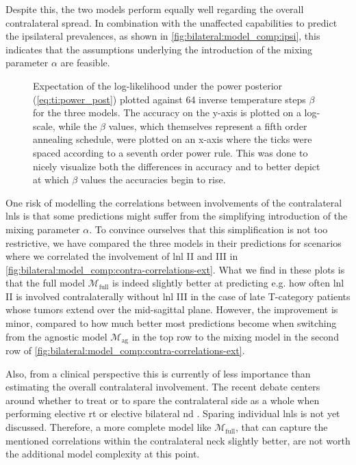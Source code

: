 \documentclass[\relativeRoot/main.tex]{subfiles}
\begin{document}
Despite this, the two models perform equally well regarding the overall contralateral spread. In combination with the unaffected capabilities to predict the ipsilateral prevalences, as shown in \cref{fig:bilateral:model_comp:ipsi}, this indicates that the assumptions underlying the introduction of the mixing parameter $\alpha$ are feasible.

\begin{figure}
    \centering
    
    \caption[Plotted accuracy over the course of a thermodynamic integration round]{
        Expectation of the log-likelihood under the power posterior (\cref{eq:ti:power_post}) plotted against 64 inverse temperature steps $\beta$ for the three models. The accuracy on the y-axis is plotted on a log-scale, while the $\beta$ values, which themselves represent a fifth order annealing schedule, were plotted on an x-axis where the ticks were spaced according to a seventh order power rule. This was done to nicely visualize both the differences in accuracy and to better depict at which $\beta$ values the accuracies begin to rise.
    }
    \label{fig:bilateral:model_comp:thermo_int}
\end{figure}

One risk of modelling the correlations between involvements of the contralateral \glspl{lnl} is that some predictions might suffer from the simplifying introduction of the mixing parameter $\alpha$. To convince ourselves that this simplification is not too restrictive, we have compared the three models in their predictions for scenarios where we correlated the involvement of \gls{lnl} II and III in \cref{fig:bilateral:model_comp:contra-correlations-ext}. What we find in these plots is that the full model $\mathcal{M}_\text{full}$ is indeed slightly better at predicting e.g. how often \gls{lnl} II is involved contralaterally without \gls{lnl} III in the case of late T-category patients whose tumors extend over the mid-sagittal plane. However, the improvement is minor, compared to how much better most predictions become when switching from the agnostic model $\mathcal{M}_\text{ag}$ in the top row to the mixing model in the second row of \cref{fig:bilateral:model_comp:contra-correlations-ext}.

Also, from a clinical perspective this is currently of less importance than estimating the overall contralateral involvement. The recent debate centers around whether to treat or to spare the contralateral side as a whole when performing elective \gls{rt} or elective bilateral \gls{nd} \cite{biau_selection_2019,al-mamgani_contralateral_2017}. Sparing individual \glspl{lnl} is not yet discussed. Therefore, a more complete model like $\mathcal{M}_\text{full}$, that can capture the mentioned correlations within the contralateral neck slightly better, are not worth the additional model complexity at this point.
\end{document}
